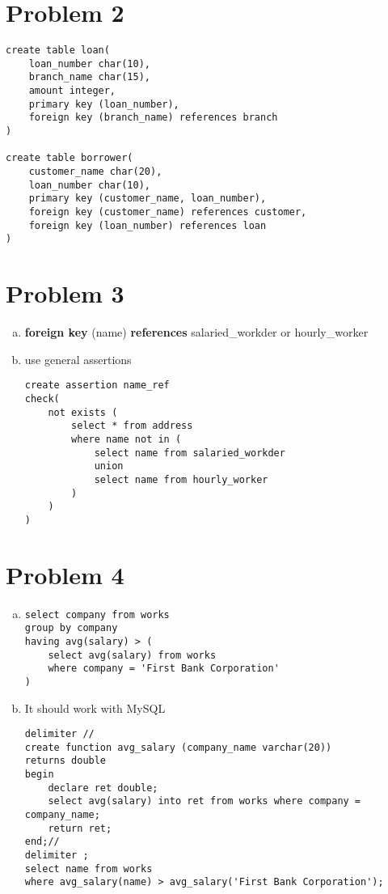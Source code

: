 \documentclass[a4paper,11pt]{article}
\begin{document}
\section*{Problem 2}
\begin{lstlisting}
create table loan(
    loan_number char(10),
    branch_name char(15),
    amount integer,
    primary key (loan_number),
    foreign key (branch_name) references branch
)

create table borrower(
    customer_name char(20),
    loan_number char(10),
    primary key (customer_name, loan_number),
    foreign key (customer_name) references customer,
    foreign key (loan_number) references loan
)
\end{lstlisting}

\section*{Problem 3}
\begin{enumerate}[a.]
\item \textbf{foreign key} (name) \textbf{references} salaried\_workder or hourly\_worker
\item use general assertions
\begin{lstlisting}
create assertion name_ref 
check(
    not exists (
        select * from address
        where name not in (
            select name from salaried_workder 
            union
            select name from hourly_worker
        )    
    )
)
\end{lstlisting}
\end{enumerate}
\section*{Problem 4}
\begin{enumerate}[a.]
\item
\begin{lstlisting}
select company from works
group by company
having avg(salary) > (
    select avg(salary) from works 
    where company = 'First Bank Corporation'
)
\end{lstlisting}
\newpage
\item It should work with MySQL
\begin{lstlisting}
delimiter //
create function avg_salary (company_name varchar(20))
returns double
begin
    declare ret double;
    select avg(salary) into ret from works where company = company_name;
    return ret;
end;//
delimiter ;
select name from works 
where avg_salary(name) > avg_salary('First Bank Corporation');
\end{lstlisting}
\end{enumerate}
\end{document}
